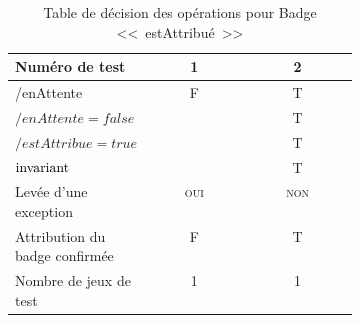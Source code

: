 \documentclass[11pt,article]{article}
\newcommand{\invariant}{\ensuremath\mathrm{invariant}}
\begin{document}
\begin{table}[!ht]
\begin{center}
\begin{tabular}{|p{0.4\linewidth}|c|c|}
\hline
Numéro de test
&1&2\\
\hline
\hline
/enAttente
&F&T\\
\hline
\hline
$/enAttente = false$
& &T\\
\hline
$/estAttribue = true$
& &T\\
\hline
$\invariant$
& &T\\
\hline
Levée d'une exception&\textsc{oui}&\textsc{non}\\
\hline
\hline
Attribution du badge confirmée
&F&T\\
\hline
\hline
Nombre de jeux de test
&1&1\\
\hline
\end{tabular}
\end{center}
\caption{Table de décision des opérations pour Badge <<~estAttribué~>>}
\end{table}
\end{document}
